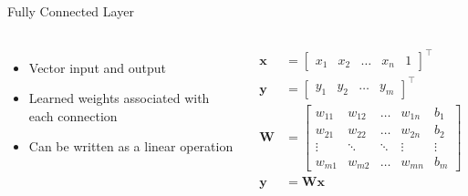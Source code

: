 \documentclass{beamer}
\begin{document}
\begin{frame}{Fully Connected Layer}
        \begin{columns}
                \begin{itemize}
                    \item Vector input and output
                    \item Learned weights associated with each connection
                    \item Can be written as a linear operation  
                \end{itemize}
                \vspace{-10pt}
                \begin{align*}
                    \mathbf{x} &= \begin{bmatrix}x_1 & x_2 & \hdots & x_n & 1 \end{bmatrix}^\intercal \\
                     \mathbf{y} &= \begin{bmatrix}y_1 & y_2 & \hdots & y_m \end{bmatrix}^\intercal\\
                     \mathbf{W} &= \begin{bmatrix} w_{11} & w_{12} & \hdots & w_{1n} & b_1 \\
                                                 w_{21} & w_{22} & \hdots & w_{2n} & b_2 \\
                                                 \vdots & \ddots & \ddots & \vdots & \vdots \\
                                                 w_{m1} & w_{m2} & \hdots & w_{mn} & b_m \end{bmatrix} \\ 
                     \mathbf{y} &= \mathbf{W}\mathbf{x}
                \end{align*}


\end{columns}
\end{frame}
\end{document}
